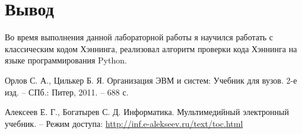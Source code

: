 \section{Вывод}
Во время выполнения данной лабораторной работы я научился работать с классическим
кодом Хэннинга, реализовал алгоритм проверки кода Хэннинга на языке программирования Python.


\begin{thebibliography}{9}
\bibitem{} Орлов С. А., Цилькер Б. Я. Организация ЭВМ и систем: Учебник для вузов. 2-е изд. -- СПб.: Питер, 2011. -- 688 с.

\bibitem{} Алексеев Е. Г., Богатырев С. Д. Информатика. Мультимедийный электронный учебник. – Режим доступа: \url{http://inf.e-alekseev.ru/text/toc.html}

\end{thebibliography}